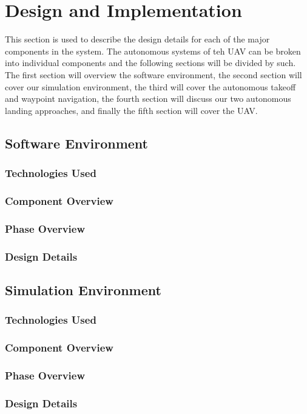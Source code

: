 
\chapter{Design  and Implementation}
This section is used to describe the design details for each of the major components in the system. The autonomous systems of teh UAV can be broken into individual components and the following sections will be divided by such. The first section will overview the software environment, the second section will cover our simulation environment, the third will cover the autonomous takeoff and waypoint navigation, the fourth section will discuss our two autonomous landing approaches, and finally the fifth section will cover the UAV.      
\section{Software Environment}
\subsection{Technologies  Used}
\subsection{Component  Overview}
\subsection{Phase Overview}
\subsection{Design Details}

\section{Simulation Environment}
\subsection{Technologies  Used}
\subsection{Component  Overview}
\subsection{Phase Overview}
\subsection{Design Details}

